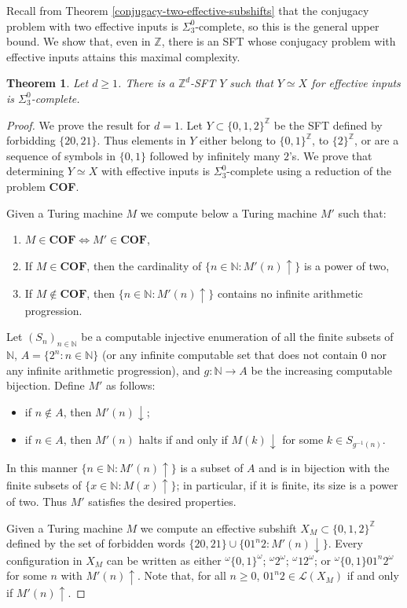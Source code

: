 \documentclass[a4paper]{article}
\newcommand{\Le}{\mathcal{L}}
\newcommand{\Z}{\mathbb{Z}}
\newcommand{\N}{\mathbb{N}}
\newtheorem{theorem}{Theorem}[section]
\theoremstyle{definition}
\begin{document}
Recall from Theorem \ref{conjugacy-two-effective-subshifts} that the conjugacy problem with two effective inputs is $\Sigma_3^0$-complete, so this is the general upper bound. We show that, even in $\Z$, there is an SFT whose conjugacy problem with effective inputs attains this maximal complexity. 
\begin{theorem}\label{conjugacy-hardness-Z}
Let $d\geq 1$. There is a $\Z^d$-SFT $Y$ such that $Y \simeq X$ for effective inputs is $\Sigma^0_3$-complete.
\end{theorem}
\begin{proof}
We prove the result for $d=1$. Let $Y\subset\{0,1,2\}^\Z$ be the SFT defined by forbidding $\{20,21\}$. Thus elements in $Y$ either belong to $\{0,1\}^\Z$, to $\{2\}^\Z$, or are a sequence of symbols in $\{0,1\}$ followed by infinitely many $2$'s. We prove that determining $Y\simeq X$ with effective inputs is $\Sigma_3^0$-complete using a reduction of the problem \textbf{COF}.

Given a Turing machine $M$ we compute below a Turing machine $M'$ such that:  
\begin{enumerate}
\item $M\in\textbf{COF} \Leftrightarrow M'\in \textbf{COF}$,
\item If $M\in\textbf{COF}$, then the cardinality of $\{n\in \N : M'(n)\uparrow\}$  is a power of two,
\item If $M\not\in \textbf{COF}$, then $\{n\in \N : M'(n)\uparrow\}$  contains no infinite arithmetic progression.
\end{enumerate}
Let $(S_n)_{n\in\N}$ be a computable injective enumeration of all the finite subsets of $\N$, $A=\{2^n : n\in\N\}$ (or any infinite computable set that does not contain $0$ nor any infinite arithmetic progression), and $g\colon\N\to A$ be the increasing computable bijection. Define $M'$ as follows:
\begin{itemize}
    \item if $n\not\in A$, then $M'(n)\downarrow$;
    \item if $n\in A$, then $M'(n)$ halts if and only if $M(k)\downarrow$ for some $k\in S_{g^{-1}(n)}$.
\end{itemize}

In this manner $\{n\in\N  : M'(n)\uparrow\}$ is a subset of $A$ and is in bijection with the finite subsets of $\{x\in \N : M(x)\uparrow\}$; in particular, if it is finite, its size is a power of two. Thus $M'$ satisfies the desired properties. 

Given a Turing machine $M$ we compute an effective subshift $X_M\subset\{0,1,2\}^\Z$ defined by the set of forbidden words $\{20,21\}\cup\{01^n2 : M'(n)\downarrow\}$. Every configuration in $X_M$ can be written as either $^\omega\{0,1\}^\omega$; $^\omega 2^\omega$; $^\omega 12^\omega$; or $^\omega\{0,1\}01^{n}2^\omega$ for some $n$ with $M'(n)\uparrow$. Note that, for all $n\geq 0$, $01^n2\in \Le(X_M)$ if and only if $M'(n)\uparrow$. 


\end{proof}
\end{document}
